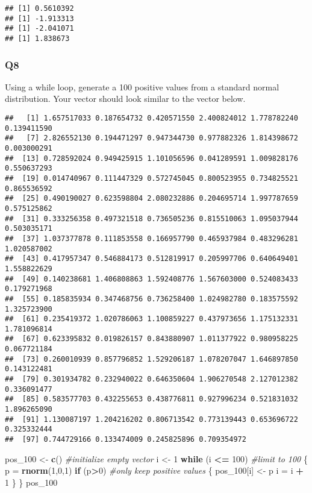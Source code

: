 \documentclass[
]{article}
\newenvironment{Shaded}{\begin{snugshade}}{\end{snugshade}}
\newcommand{\CommentTok}[1]{\textcolor[rgb]{0.56,0.35,0.01}{\textit{#1}}}
\newcommand{\ControlFlowTok}[1]{\textcolor[rgb]{0.13,0.29,0.53}{\textbf{#1}}}
\newcommand{\DecValTok}[1]{\textcolor[rgb]{0.00,0.00,0.81}{#1}}
\newcommand{\KeywordTok}[1]{\textcolor[rgb]{0.13,0.29,0.53}{\textbf{#1}}}
\newcommand{\NormalTok}[1]{#1}
\newcommand{\OperatorTok}[1]{\textcolor[rgb]{0.81,0.36,0.00}{\textbf{#1}}}
\newcommand{\StringTok}[1]{\textcolor[rgb]{0.31,0.60,0.02}{#1}}
\begin{document}
\begin{verbatim}
## [1] 0.5610392
## [1] -1.913313
## [1] -2.041071
## [1] 1.838673
\end{verbatim}

\hypertarget{q8}{%
\subsubsection{Q8}\label{q8}}

Using a while loop, generate a 100 positive values from a standard
normal distribution. Your vector should look similar to the vector
below.

\begin{verbatim}
##   [1] 1.657517033 0.187654732 0.420571550 2.400824012 1.778782240 0.139411590
##   [7] 2.826552130 0.194471297 0.947344730 0.977882326 1.814398672 0.003000291
##  [13] 0.728592024 0.949425915 1.101056596 0.041289591 1.009828176 0.550637293
##  [19] 0.014740967 0.111447329 0.572745045 0.800523955 0.734825521 0.865536592
##  [25] 0.490190027 0.623598804 2.080232886 0.204695714 1.997787659 0.575125862
##  [31] 0.333256358 0.497321518 0.736505236 0.815510063 1.095037944 0.503035171
##  [37] 1.037377878 0.111853558 0.166957790 0.465937984 0.483296281 1.020587002
##  [43] 0.417957347 0.546884173 0.512819917 0.205997706 0.640649401 1.558822629
##  [49] 0.140238681 1.406808863 1.592408776 1.567603000 0.524083433 0.179271968
##  [55] 0.185835934 0.347468756 0.736258400 1.024982780 0.183575592 1.325723900
##  [61] 0.235419372 1.020786063 1.100859227 0.437973656 1.175132331 1.781096814
##  [67] 0.623395832 0.019826157 0.843880907 1.011377922 0.980958225 0.067721184
##  [73] 0.260010939 0.857796852 1.529206187 1.078207047 1.646897850 0.143122481
##  [79] 0.301934782 0.232940022 0.646350604 1.906270548 2.127012382 0.336091477
##  [85] 0.583577703 0.432255653 0.438776811 0.927996234 0.521831032 1.896265090
##  [91] 1.130087197 1.204216202 0.806713542 0.773139443 0.653696722 0.325332444
##  [97] 0.744729166 0.133474009 0.245825896 0.709354972
\end{verbatim}

\begin{Shaded}
\begin{Highlighting}[]
\NormalTok{pos_}\DecValTok{100}\NormalTok{ <-}\StringTok{ }\KeywordTok{c}\NormalTok{() }\CommentTok{#initialize empty vector}
\NormalTok{i <-}\StringTok{ }\DecValTok{1}
\ControlFlowTok{while}\NormalTok{ (i }\OperatorTok{<=}\StringTok{ }\DecValTok{100}\NormalTok{) }\CommentTok{#limit to 100 }
\NormalTok{\{}
\NormalTok{  p =}\StringTok{ }\KeywordTok{rnorm}\NormalTok{(}\DecValTok{1}\NormalTok{,}\DecValTok{0}\NormalTok{,}\DecValTok{1}\NormalTok{)}
  \ControlFlowTok{if}\NormalTok{ (p}\OperatorTok{>}\DecValTok{0}\NormalTok{) }\CommentTok{#only keep positive values}
\NormalTok{  \{}
\NormalTok{    pos_}\DecValTok{100}\NormalTok{[i] <-}\StringTok{ }\NormalTok{p}
\NormalTok{    i =}\StringTok{ }\NormalTok{i }\OperatorTok{+}\StringTok{ }\DecValTok{1}
\NormalTok{  \}}
\NormalTok{\}}
\NormalTok{pos_}\DecValTok{100}
\end{Highlighting}
\end{Shaded}
\end{document}
